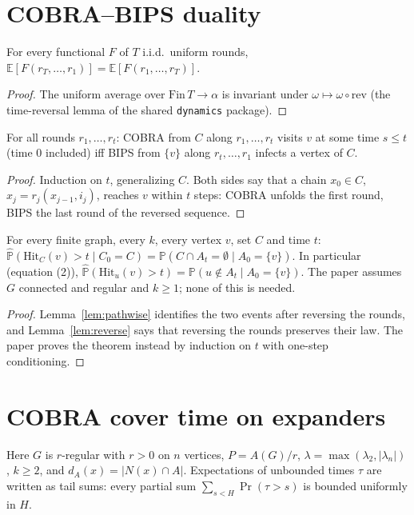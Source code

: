 \section{COBRA--BIPS duality}
\begin{lemma}\label{lem:reverse}
\leanok
For every functional $F$ of $T$ i.i.d.\ uniform rounds,
$\mathbb E[F(r_T,\dots,r_1)]=\mathbb E[F(r_1,\dots,r_T)]$.
\end{lemma}
\begin{proof}\leanok
The uniform average over $\mathrm{Fin}\,T\to\alpha$ is invariant under $\omega\mapsto\omega\circ\mathrm{rev}$
(the time-reversal lemma of the shared \texttt{dynamics} package).
\end{proof}
\begin{lemma}\label{lem:pathwise}
\leanok{}
For all rounds $r_1,\dots,r_t$: COBRA from $C$ along $r_1,\dots,r_t$ visits $v$ at some time
$s\le t$ (time $0$ included) iff BIPS from $\{v\}$ along $r_t,\dots,r_1$ infects a vertex of $C$.
\end{lemma}
\begin{proof}\leanok
Induction on $t$, generalizing $C$. Both sides say that a chain $x_0\in C$,
$x_j=r_j(x_{j-1},i_j)$, reaches $v$ within $t$ steps: COBRA unfolds the first round, BIPS the
last round of the reversed sequence.
\end{proof}
\begin{theorem}\label{thm:duality}
\leanok{}
For every finite graph, every $k$, every vertex $v$, set $C$ and time $t$:
$\hat{\mathbb P}(\mathrm{Hit}_C(v)>t\mid C_0=C)=\mathbb P(C\cap A_t=\emptyset\mid A_0=\{v\})$. In
particular (equation (2)), $\hat{\mathbb P}(\mathrm{Hit}_u(v)>t)=\mathbb P(u\notin A_t\mid A_0=\{v\})$.
The paper assumes $G$ connected and regular and $k\ge1$; none of this is needed.
\end{theorem}
\begin{proof}\leanok
Lemma~\ref{lem:pathwise} identifies the two events after reversing the rounds, and
Lemma~\ref{lem:reverse} says that reversing the rounds preserves their law. The paper proves the
theorem instead by induction on $t$ with one-step conditioning.
\end{proof}

\section{COBRA cover time on expanders}\label{sec:crr-cover}
Here $G$ is $r$-regular with $r>0$ on $n$ vertices, $P=A(G)/r$, $\lambda=\max(\lambda_2,|\lambda_n|)$,
$k\ge2$, and $d_A(x)=|N(x)\cap A|$. Expectations of unbounded times $\tau$ are written as tail
sums: every partial sum $\sum_{s<H}\Pr(\tau>s)$ is bounded uniformly in $H$.

